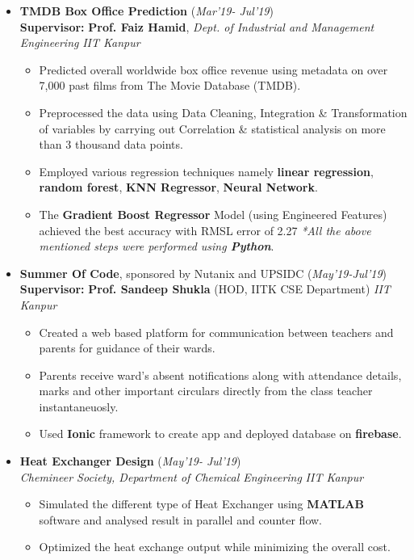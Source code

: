 \documentclass[10pt]{extarticle}
\begin{document}
\begin{itemize}
\item \textbf{TMDB Box Office Prediction} \hfill\hfill(\textit{Mar'19- Jul'19})\\\textbf{Supervisor: }\textbf{Prof. Faiz Hamid}, \textit{Dept. of Industrial and Management Engineering}
\hfill\hfill{\small{\textit{IIT Kanpur}}}
\begin{itemize}
\item Predicted overall worldwide box office revenue using metadata on over 7,000 past films from  The Movie Database (TMDB).
\item Preprocessed the data using Data Cleaning, Integration \& Transformation of variables by carrying out Correlation \& statistical analysis on more than 3 thousand data points.
\item Employed various regression techniques namely \textbf{linear regression}, \textbf{random forest}, \textbf{KNN Regressor}, \textbf{Neural Network}.
\item The \textbf{Gradient Boost Regressor} Model (using Engineered Features) achieved the best accuracy with RMSL error of 2.27
\hfill\small\textit{{{*All the above mentioned steps were performed using \textbf{Python}}}}. 
\end{itemize}
\item \textbf{Summer Of Code}, \small{sponsored by Nutanix and UPSIDC}
\hfill\hfill(\textit{May'19-Jul'19})\\\textbf{Supervisor: }\textbf{Prof. Sandeep Shukla} (HOD, IITK CSE Department) %
\hfill\hfill{\small{\textit{IIT Kanpur}}}
\begin{itemize}
\item Created a web based platform for communication between teachers and parents for guidance of their wards.
\item Parents receive ward's absent notifications along with attendance details, marks and other important circulars directly from the class teacher instantaneuosly.
\item Used \textbf{Ionic} framework to create app and deployed database on \textbf{firebase}.
\end{itemize}
\item \textbf{Heat Exchanger Design} \hfill\hfill(\textit{May'19- Jul'19})\\\textit{Chemineer Society, Department of Chemical Engineering}
\hfill\hfill{\small{\textit{IIT Kanpur}}}\\
\vspace{-4mm}
\begin{itemize}[label={*}]
\item Simulated the different type of Heat Exchanger using \textbf{MATLAB} software and analysed result in parallel and counter flow.
\item Optimized the heat exchange output while minimizing
the overall cost.
\end{itemize}
\end{itemize}
\end{document}
